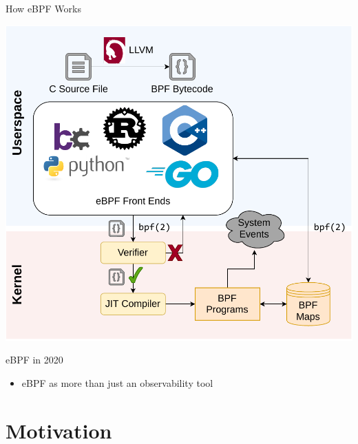 \documentclass[12pt, dvipsnames]{beamer}
\begin{document}
\begin{frame}[c]{How eBPF Works}
\begin{center}
    \color{black}
    \includegraphics[height=0.8\textheight]{figs/how-ebpf-works.pdf}
\end{center}
\end{frame}

\begin{frame}[t]{eBPF in 2020}
    \begin{itemize}
        \item eBPF as more than just an observability tool
    \end{itemize}
\end{frame}

\section{Motivation}

\end{document}
